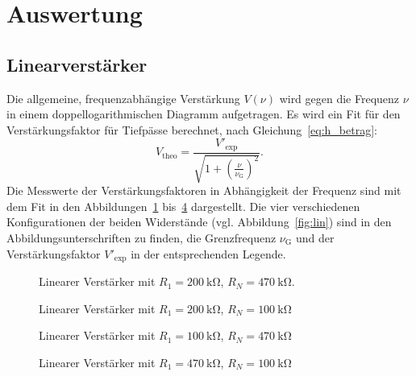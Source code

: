 \section{Auswertung}%
\label{sec:auswertung}
\subsection{Linearverst\"arker}
Die allgemeine, frequenzabhängige Verstärkung $V\!\left(\nu\right)$ wird gegen die Frequenz $\nu$ in einem doppellogarithmischen Diagramm aufgetragen.
Es wird ein Fit für den Verstärkungsfaktor für Tiefpässe berechnet, nach Gleichung~\eqref{eq:h_betrag}:
\begin{equation}
  V_\text{theo} = \frac{V'_{\text{exp}}}{\sqrt{1 + {\left({\frac{\nu}{\nu_\text{G}}}\right)}^{2}}}.
\end{equation}
Die Messwerte der Verstärkungsfaktoren in Abhängigkeit der Frequenz
sind mit dem Fit in den Abbildungen~\ref{fig:lin_verst_01} bis~\ref{fig:lin_verst_04} dargestellt.
Die vier verschiedenen Konfigurationen der beiden Widerstände (vgl. Abbildung~\ref{fig:lin})
sind in den Abbildungsunterschriften zu finden,
die Grenzfrequenz $\nu_\text{G}$ und der Verstärkungsfaktor $V'_\text{exp}$ in der entsprechenden Legende.

\begin{figure}[ht]
  \centering
  
  \caption{Linearer Verstärker mit $R_1 = \SI{200}{\kilo\ohm}$, $R_N = \SI{470}{\kilo\ohm}$.}
  \label{fig:lin_verst_01}
\end{figure}

\begin{figure}[ht]
  \centering
  
  \caption{Linearer Verst\"arker mit $R_1 = \SI{200}{\kilo\ohm}$, $R_N = \SI{100}{\kilo\ohm}$}
  \label{fig:lin_verst_02}
\end{figure}

\begin{figure}[ht]
  \centering
  
  \caption{Linearer Verst\"arker mit $R_1 = \SI{100}{\kilo\ohm}$, $R_N = \SI{470}{\kilo\ohm}$}
  \label{fig:lin_verst_03}
\end{figure}

\begin{figure}[ht]
  \centering
  
  \caption{Linearer Verst\"arker mit $R_1 = \SI{470}{\kilo\ohm}$, $R_N = \SI{100}{\kilo\ohm}$}
  \label{fig:lin_verst_04}
\end{figure}

